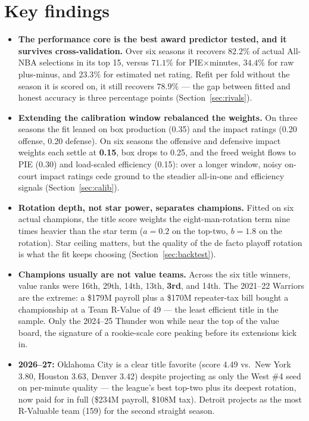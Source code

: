 \documentclass[11pt]{article}
\begin{document}
\section{Key findings}
\begin{itemize}[itemsep=2pt]
\item \textbf{The performance core is the best award predictor tested, and it
survives cross-validation.} Over six seasons it recovers $82.2\%$ of actual
All-NBA selections in its top 15, versus $71.1\%$ for PIE$\times$minutes,
$34.4\%$ for raw plus-minus, and $23.3\%$ for estimated net rating. Refit
per fold without the season it is scored on, it still recovers $78.9\%$ ---
the gap between fitted and honest accuracy is three percentage points
(Section~\ref{sec:rivals}).
\item \textbf{Extending the calibration window rebalanced the weights.} On
three seasons the fit leaned on box production (0.35) and the impact ratings
(0.20 offense, 0.20 defense). On six seasons the offensive and defensive
impact weights each settle at \textbf{0.15}, box drops to 0.25, and the freed
weight flows to PIE (0.30) and load-scaled efficiency (0.15): over a longer
window, noisy on-court impact ratings cede ground to the steadier all-in-one
and efficiency signals (Section~\ref{sec:calib}).
\item \textbf{Rotation depth, not star power, separates champions.} Fitted on
six actual champions, the title score weights the eight-man-rotation term nine
times heavier than the star term ($a = 0.2$ on the top-two, $b = 1.8$ on the
rotation). Star ceiling matters, but the quality of the de facto playoff
rotation is what the fit keeps choosing (Section~\ref{sec:backtest}).
\item \textbf{Champions usually are not value teams.} Across the six title
winners, value ranks were 16th, 29th, 14th, 13th, \textbf{3rd}, and 14th. The
2021--22 Warriors are the extreme: a \$179M payroll plus a \$170M repeater-tax
bill bought a championship at a Team R-Value of 49 --- the least efficient
title in the sample. Only the 2024--25 Thunder won while near the top of the
value board, the signature of a rookie-scale core peaking before its
extensions kick in.
\item \textbf{2026--27:} Oklahoma City is a clear title favorite (score 4.49
vs.\ New York 3.80, Houston 3.63, Denver 3.42) despite projecting as only the
West \#4 seed on per-minute quality --- the league's best top-two plus its
deepest rotation, now paid for in full (\$234M payroll, \$108M tax). Detroit
projects as the most R-Valuable team (159) for the second straight season.
\end{itemize}
\end{document}
